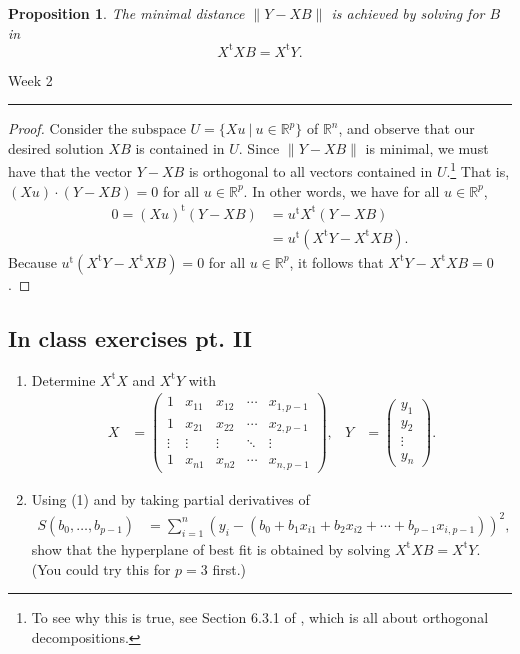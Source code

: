 \documentclass[a4paper, 12pt]{article}
\numberwithin{equation}{section}
\numberwithin{figure}{section}
\newtheorem{prop}[thm]{Proposition}
\theoremstyle{definition}
\newcommand{\R}{\mathbb{R}}
\newcommand{\tr}{\mathrm{t}}
\newcommand{\WEEK}[1]{%
\hfill Week #1

\vspace{-1em}

\begin{center}
	\rule{\textwidth}{2pt}
\end{center}
\vspace{0.5em}%
}
\begin{document}
\begin{prop}
	The minimal distance $\| Y - XB \|$ is achieved by solving for $B$ in 
	\[ 
		X^{\tr} X B = X^{\tr} Y.
	\] 
\end{prop}

\WEEK{2}

\begin{proof} 
	Consider the subspace $U = \{Xu ~|~ u\in\R^p\}$ of $\R^n$, and observe that
	our desired solution $XB$ is contained in $U$. Since $\| Y - XB \|$ is
	minimal, we must have that the vector $Y - XB$ is orthogonal to all vectors
	contained in $U$.\footnote{To see why this is true, see Section 6.3.1 of
	\cite{ILA}, which is all about orthogonal decompositions.} That is, $(Xu)
	\cdot (Y - XB) = 0$ for all $u\in\R^p$. In other words, we have for all
	$u\in \R^p$,
	\begin{align*} 
		0 = (Xu)^{\tr} (Y - XB) &= u^{\tr} X^{\tr}(Y - XB) \\
		&= u^{\tr} \left(X^{\tr}Y - X^{\tr}XB\right).
	\end{align*}
	Because $u^{\tr} \left(X^{\tr}Y - X^{\tr}XB\right)=0$ for all $u\in \R^p$,
	it follows that $X^{\tr}Y - X^{\tr}XB=0$. 
\end{proof}

\subsection{In class exercises pt. II}

\begin{enumerate}
	\item Determine $X^{\tr}X$ and $X^{\tr}Y$ with
	\begin{align*}
		X &= \begin{pmatrix}
			1 & x_{11} & x_{12} & \cdots & x_{1,p-1} \\
			1 & x_{21} & x_{22} & \cdots & x_{2,p-1} \\
			\vdots & \vdots & \vdots & \ddots & \vdots \\
			1 & x_{n1} & x_{n2} & \cdots & x_{n,p-1} 
		\end{pmatrix}, & 
		Y &= \begin{pmatrix}
			y_1 \\ y_2 \\ \vdots \\ y_n 
		\end{pmatrix}.
	\end{align*}
	\item Using (1) and by taking partial derivatives of 
	\begin{align}\label{eqn:S-function}
		S(b_0, \dots, b_{p-1}) &= \sum_{i=1}^n (y_i - (b_0 + b_1x_{i1} + b_2x_{i2} + \cdots + b_{p-1}x_{i,p-1}))^2,
	\end{align}
	show that the hyperplane of best fit is obtained by solving
	$X^{\tr}XB=X^{\tr}Y$. (You could try this for $p=3$ first.)
\end{enumerate}
\end{document}
